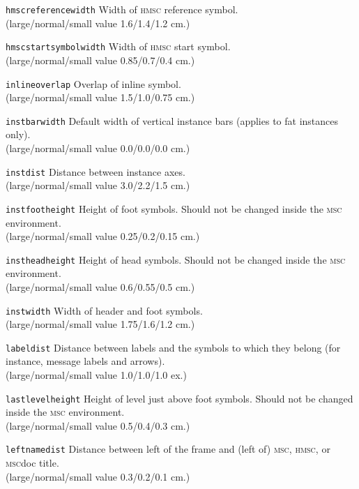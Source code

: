 \documentclass[a4paper]{article}
\newcommand{\cmd}[1]{\texttt{\bslash #1}}
\newcommand{\acro}[1]{{\scshape\lowercase{#1}}}
\newcommand\MSC{\acro{MSC}}
\newcommand\HMSC{\acro{HMSC}}
\newcommand{\MSCdoc}{\MSC{}doc}
\newcommand{\lnsvalue}[3]{large/normal/small value #1/#2/#3}
\newenvironment{defs}{%
  \begin{list}{}%
              {\setlength{\labelwidth}{0pt}%
               \setlength{\labelsep}{1em}%
               \setlength{\leftmargin}{1em}%
               \setlength{\parsep}{1ex}%
               \setlength{\listparindent}{0pt}%
               \setlength{\rightmargin}{0pt}%
               \renewcommand{\makelabel}[1]{##1}%
               \raggedright%
              }%
  }{%
  \end{list}}
\begin{document}
\begin{defs}
\item[\cmd{hmscreferencewidth}]
Width of \HMSC{} reference symbol.\\
(\lnsvalue{1.6}{1.4}{1.2} cm.)

\item[\cmd{hmscstartsymbolwidth}]
Width of \HMSC{} start symbol.\\
(\lnsvalue{0.85}{0.7}{0.4} cm.)

\item[\cmd{inlineoverlap}]
Overlap of inline symbol.\\
(\lnsvalue{1.5}{1.0}{0.75} cm.)

\item[\cmd{instbarwidth}]
Default width of vertical instance bars (applies to fat instances only).\\
(\lnsvalue{0.0}{0.0}{0.0} cm.)

\item[\cmd{instdist}]
Distance between instance axes.\\
(\lnsvalue{3.0}{2.2}{1.5} cm.)

\item[\cmd{instfootheight}] Height of foot symbols. Should not be
changed inside the \MSC{} environment.\\
(\lnsvalue{0.25}{0.2}{0.15} cm.)

\item[\cmd{instheadheight}] Height of head symbols. Should not be
changed inside the \MSC{} environment.\\
(\lnsvalue{0.6}{0.55}{0.5} cm.)

\item[\cmd{instwidth}]
Width of header and foot symbols.\\
(\lnsvalue{1.75}{1.6}{1.2} cm.)

\item[\cmd{labeldist}]
Distance between labels and the symbols to which they belong (for instance, message labels and arrows).\\
(\lnsvalue{1.0}{1.0}{1.0} ex.)

\item[\cmd{lastlevelheight}] Height of level just above foot
symbols. Should not be changed inside the \MSC{} environment.\\
(\lnsvalue{0.5}{0.4}{0.3} cm.)

\item[\cmd{leftnamedist}] Distance between left of the frame and
(left of) \MSC, \HMSC, or \MSCdoc{} title.\\
(\lnsvalue{0.3}{0.2}{0.1} cm.)


\end{defs}
\end{document}

